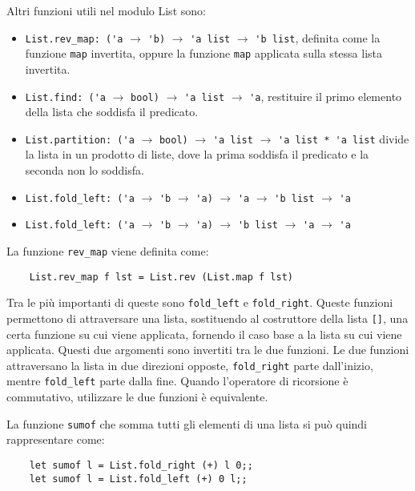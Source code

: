 \documentclass{article}
\numberwithin{equation}{subsection}
\begin{document}
Altri funzioni utili nel modulo List sono:
\begin{itemize}
    \item \verb|List.rev_map: ('a| $\rightarrow$ \verb|'b)| $\rightarrow$ \verb|'a list| $\rightarrow$ \verb|'b list|, definita come la funzione \verb|map| invertita, oppure la funzione \verb|map| applicata sulla stessa lista invertita.  
    \item \verb|List.find: ('a| $\rightarrow$ \verb|bool)| $\rightarrow$ \verb|'a list| $\rightarrow$ \verb|'a|, restituire il primo elemento della lista che soddisfa il predicato.
    \item \verb|List.partition: ('a| $\rightarrow$ \verb|bool)| $\rightarrow$ \verb|'a list| $\rightarrow$ \verb|'a list * 'a list| divide la lista in un prodotto di liste, dove la prima soddisfa il predicato e la seconda non lo soddisfa. 
    \item \verb|List.fold_left: ('a| $\rightarrow$ \verb|'b| $\rightarrow$ \verb|'a)| $\rightarrow$ \verb|'a| $\rightarrow$ \verb|'b list| $\rightarrow$ \verb|'a| 
    \item \verb|List.fold_left: ('a| $\rightarrow$ \verb|'b| $\rightarrow$ \verb|'a)| $\rightarrow$ \verb|'b list| $\rightarrow$ \verb|'a| $\rightarrow$ \verb|'a|
\end{itemize}
La funzione \verb|rev_map| viene definita come:
\begin{verbatim}
    List.rev_map f lst = List.rev (List.map f lst)    
\end{verbatim}
Tra le più importanti di queste sono \verb|fold_left| e \verb|fold_right|. 
Queste funzioni permettono di attraversare una lista, sostituendo al costruttore della lista \verb|[]|, una certa funzione su cui viene applicata, fornendo il caso base a la lista su cui viene applicata. Questi due argomenti sono invertiti tra le due funzioni. Le due funzioni attraversano la lista in due direzioni opposte, \verb|fold_right| parte dall'inizio, mentre \verb|fold_left| parte dalla fine. Quando l'operatore di ricorsione è commutativo, utilizzare le due funzioni è equivalente. 


La funzione \verb|sumof| che somma tutti gli elementi di una lista si può quindi rappresentare come:
\begin{verbatim}
    let sumof l = List.fold_right (+) l 0;;
    let sumof l = List.fold_left (+) 0 l;;    
\end{verbatim}
\end{document}
